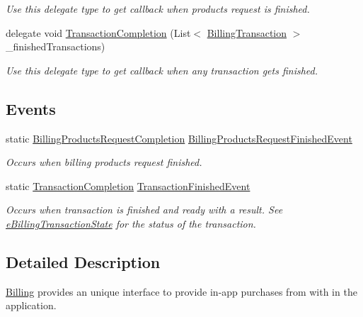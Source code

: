 \begin{DoxyCompactItemize}
\begin{DoxyCompactList}\small\item\em Use this delegate type to get callback when products request is finished. \end{DoxyCompactList}\item 
delegate void \hyperlink{class_voxel_busters_1_1_native_plugins_1_1_billing_a699955fbb88fca96d0c7cda1d3c4b736}{Transaction\+Completion} (List$<$ \hyperlink{class_voxel_busters_1_1_native_plugins_1_1_billing_transaction}{Billing\+Transaction} $>$ \+\_\+finished\+Transactions)
\begin{DoxyCompactList}\small\item\em Use this delegate type to get callback when any transaction gets finished. \end{DoxyCompactList}\end{DoxyCompactItemize}
\subsection*{Events}
\begin{DoxyCompactItemize}
\item 
static \hyperlink{class_voxel_busters_1_1_native_plugins_1_1_billing_a59d14c1fff02f8bbf1946415f81b77f0}{Billing\+Products\+Request\+Completion} \hyperlink{class_voxel_busters_1_1_native_plugins_1_1_billing_a2b73687297c706b0cf67bd0aaa64a782}{Billing\+Products\+Request\+Finished\+Event}
\begin{DoxyCompactList}\small\item\em Occurs when billing products request finished. \end{DoxyCompactList}\item 
static \hyperlink{class_voxel_busters_1_1_native_plugins_1_1_billing_a699955fbb88fca96d0c7cda1d3c4b736}{Transaction\+Completion} \hyperlink{class_voxel_busters_1_1_native_plugins_1_1_billing_ad59cc097e59a8605d00c8a0b9a1743cb}{Transaction\+Finished\+Event}
\begin{DoxyCompactList}\small\item\em Occurs when transaction is finished and ready with a result. See \hyperlink{namespace_voxel_busters_1_1_native_plugins_a1b545f54cd8f7e04410c379e01ff27f2}{e\+Billing\+Transaction\+State} for the status of the transaction. \end{DoxyCompactList}\end{DoxyCompactItemize}


\subsection{Detailed Description}
\hyperlink{class_voxel_busters_1_1_native_plugins_1_1_billing}{Billing} provides an unique interface to provide in-\/app purchases from with in the application. 

